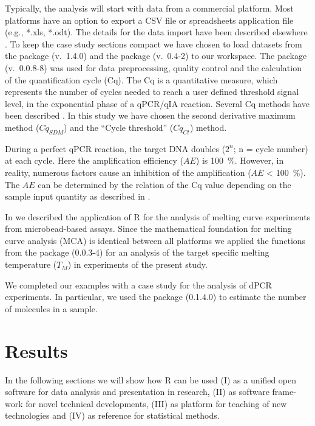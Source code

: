 Typically, the analysis will start with data from a commercial platform. 
Most platforms have an option to export a CSV file or spreadsheets application 
file (e.g., *.xls, *.odt). The details for the data import have been described 
elsewhere \citep{RDCT2010c, rodiger_rkward_2012}. To keep the case study 
sections compact we have chosen to load datasets from the  
package 
\citep{ritz_2008, spiess_2008} (v.~1.4.0) and the  package 
(v.~0.4-2) to our workspace. The  package 
\citep{roediger_2015_Bioinformatics} (v.~0.0.8-8) was used 
for data preprocessing, quality control and  the calculation of the 
quantification cycle (Cq). The Cq is a quantitative measure, which represents 
the number of cycles needed to reach a user defined threshold signal level, in 
the exponential phase of a qPCR/qIA reaction. Several Cq methods have been 
described \citep{ruijter_2013}. In this study we have chosen the second 
derivative maximum method ($Cq_{SDM}$) and the ``Cycle threshold'' ($Cq_{Ct}$) 
method.

During a perfect qPCR reaction, the target DNA doubles ($2^{n}$; n = cycle 
number) at each cycle. Here the amplification efficiency ($AE$) is 100~\%. 
However, in reality, numerous factors cause an inhibition of the amplification 
($AE$ < 100~\%). The $AE$ can be determined by the relation of the Cq value 
depending on the sample input quantity as described in 
\citet{roediger_chippcr_2014}.

In \citet{roediger_RJ_2013} we described the application of R for the analysis 
of melting curve experiments from microbead-based assays. Since the 
mathematical 
foundation for melting curve analysis (MCA) is identical between all platforms 
we applied the functions from the  package (0.0.3-4) for an 
analysis of the target specific melting temperature ($T_{M}$) in experiments of 
the present study.

We completed our examples with a case study for the analysis of dPCR 
experiments. In particular, we used the  package (0.1.4.0) to 
estimate the 
number of molecules in a sample.

\section{Results}

In the following sections we will show how R can be used (I) as a unified open 
software for data analysis and presentation in research, 
(II) as software frame-work for novel technical developments, (III) as platform 
for teaching of new technologies and (IV) as reference for statistical methods.


